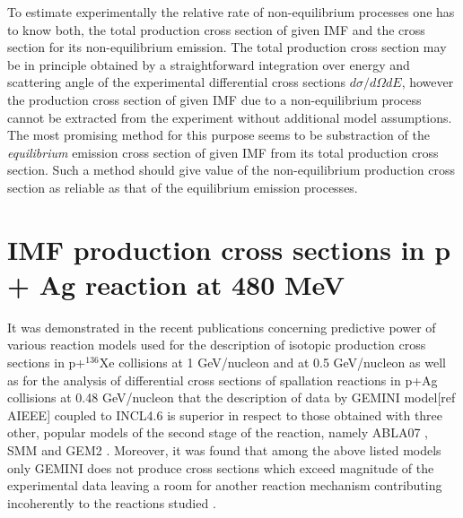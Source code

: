 To estimate experimentally the relative rate of non-equilibrium
processes one has to know both, the total production cross section
of given IMF and the cross section for its non-equilibrium emission.
The total production cross section may be in principle obtained by a
straightforward integration over energy and scattering angle of the
experimental differential cross sections $d\sigma/d\Omega dE$,
however the production cross section of given IMF due to a
non-equilibrium process cannot be extracted from the experiment
without additional model assumptions.  The most promising method for
this purpose seems to be substraction of the \emph{equilibrium}
emission cross section of given IMF  from its total production cross
section. Such a method should give value of the non-equilibrium
production cross section as reliable as that of the equilibrium
emission processes.  %
\section{IMF production cross sections in p + Ag reaction at 480 MeV}


It was demonstrated in the recent publications concerning predictive
power of various reaction models used for the description of
isotopic production cross sections in p+$^{136}$Xe collisions at 1
GeV/nucleon \cite{singh2018predictive} and at 0.5 GeV/nucleon \cite{sharma2017ranking}
as well as for the analysis of differential cross sections of
spallation reactions in p+Ag collisions at 0.48 GeV/nucleon
\cite{sharma2016ranking} that the description of data by GEMINI model\cite{CHARITY1988,Charity2010}[ref AIEEE] coupled to INCL4.6
\cite{boudard2013new} is superior in respect to those obtained with
three other, popular models of the second stage of the reaction,
namely ABLA07 \cite{ABLA07}, SMM \cite{Bondorf95A} and GEM2
\cite{Furihata00A,Furihata02A}. Moreover, it was found that among
the above listed models only GEMINI does not produce cross sections
which exceed magnitude of the experimental data leaving a room for
another reaction mechanism contributing incoherently to the
reactions studied \cite{Sharma16A}.




